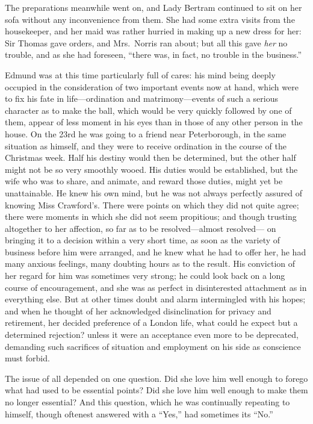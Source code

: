 The preparations meanwhile went on, and Lady Bertram continued
to sit on her sofa without any inconvenience from them.
She had some extra visits from the housekeeper, and her
maid was rather hurried in making up a new dress for her:
Sir Thomas gave orders, and Mrs.\ Norris ran about;
but all this gave \emph{her} no trouble, and as she had foreseen,
``there was, in fact, no trouble in the business.''

Edmund was at this time particularly full of cares:
his mind being deeply occupied in the consideration of two
important events now at hand, which were to fix his fate
in life---ordination and matrimony---events of such a serious
character as to make the ball, which would be very quickly
followed by one of them, appear of less moment in his
eyes than in those of any other person in the house.
On the 23rd he was going to a friend near Peterborough,
in the same situation as himself, and they were to
receive ordination in the course of the Christmas week.
Half his destiny would then be determined, but the other
half might not be so very smoothly wooed.  His duties would
be established, but the wife who was to share, and animate,
and reward those duties, might yet be unattainable.
He knew his own mind, but he was not always perfectly assured
of knowing Miss Crawford's. There were points on which they
did not quite agree; there were moments in which she did
not seem propitious; and though trusting altogether to
her affection, so far as to be resolved---almost resolved---%
on bringing it to a decision within a very short time,
as soon as the variety of business before him were arranged,
and he knew what he had to offer her, he had many
anxious feelings, many doubting hours as to the result.
His conviction of her regard for him was sometimes very strong;
he could look back on a long course of encouragement,
and she was as perfect in disinterested attachment as
in everything else.  But at other times doubt and alarm
intermingled with his hopes; and when he thought of her
acknowledged disinclination for privacy and retirement,
her decided preference of a London life, what could he expect
but a determined rejection? unless it were an acceptance
even more to be deprecated, demanding such sacrifices
of situation and employment on his side as conscience
must forbid.

The issue of all depended on one question.  Did she
love him well enough to forego what had used to be
essential points?  Did she love him well enough to make
them no longer essential?  And this question, which he
was continually repeating to himself, though oftenest
answered with a ``Yes,'' had sometimes its ``No.''

